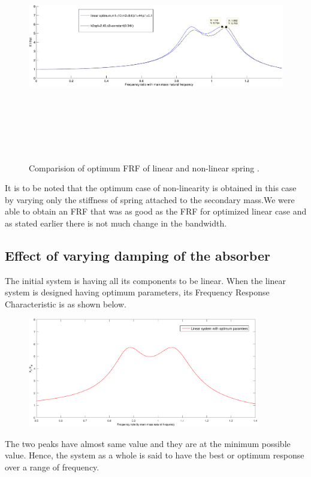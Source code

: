 \begin{figure}[h!]
  \includegraphics[width=16cm,height=10cm]{"figures/nonlinearity_primaryymass_3b_effect of secondaryspring_only optimums"}
  \caption{Comparision of optimum FRF of linear and non-linear spring .}
  \label{fig:optimum stiffness}
\end{figure}

It is to be noted that  the optimum case of non-linearity is obtained in this case by varying only the stiffness of spring attached to the secondary mass.We were able to obtain an FRF that was as good as the FRF for optimized linear case and as stated earlier there is not much change in the bandwidth.

\subsection{Effect of varying damping of the absorber}
The initial system is having all its components to be linear. When the linear system is designed having optimum parameters, its Frequency Response Characteristic is as shown below.\\[0.2in]
\begin{figure}[h!]
\includegraphics[width=0.9\textwidth]{"figures/linear"}\\[0.1in]
\end{figure}
The two peaks have almost same value and they are at the minimum possible value. Hence, the system as a whole is said to have the best or optimum response over a range of frequency.

